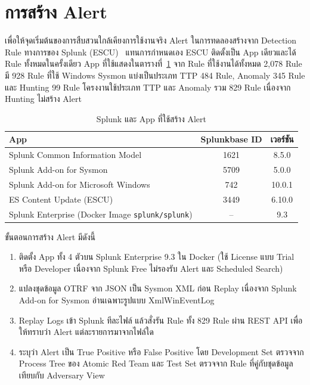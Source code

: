 \section{การสร้าง Alert}
\label{sec:alert}

เพื่อให้จุดเริ่มต้นของการสืบสวนใกล้เคียงการใช้งานจริง Alert ในการทดลองสร้างจาก Detection Rule ทางการของ Splunk (ESCU)~\cite{splunk-escu}
แทนการกำหนดเอง ESCU ติดตั้งเป็น App เดียวและได้ Rule ทั้งหมดในครั้งเดียว
App ที่ใช้แสดงในตารางที่~\ref{tab:splunk-apps}
จาก Rule ที่ใช้งานได้ทั้งหมด 2,078 Rule มี 928 Rule ที่ใช้ Windows Sysmon
แบ่งเป็นประเภท TTP 484 Rule, Anomaly 345 Rule และ Hunting 99 Rule
โครงงานใช้ประเภท TTP และ Anomaly รวม 829 Rule เนื่องจาก Hunting ไม่สร้าง Alert

\begin{table}[ht]
  \centering
  \caption{Splunk และ App ที่ใช้สร้าง Alert}
  \label{tab:splunk-apps}
  \small
  \begin{tabular}{|l|c|c|}
    \hline
    \textbf{App} & \textbf{Splunkbase ID} & \textbf{เวอร์ชัน} \\ \hline
    Splunk Common Information Model & 1621 & 8.5.0 \\ \hline
    Splunk Add-on for Sysmon & 5709 & 5.0.0 \\ \hline
    Splunk Add-on for Microsoft Windows & 742 & 10.0.1 \\ \hline
    ES Content Update (ESCU) & 3449 & 6.10.0 \\ \hline
    Splunk Enterprise (Docker Image \texttt{splunk/splunk}) & -- & 9.3 \\ \hline
  \end{tabular}
\end{table}

ขั้นตอนการสร้าง Alert มีดังนี้
\begin{enumerate}
  \item ติดตั้ง App ทั้ง 4 ตัวบน Splunk Enterprise 9.3 ใน Docker (ใช้ License แบบ Trial หรือ Developer
        เนื่องจาก Splunk Free ไม่รองรับ Alert และ Scheduled Search)
  \item แปลงชุดข้อมูล OTRF จาก JSON เป็น Sysmon XML ก่อน Replay
        เนื่องจาก Splunk Add-on for Sysmon อ่านเฉพาะรูปแบบ XmlWinEventLog
  \item Replay Logs เข้า Splunk ทีละไฟล์ แล้วสั่งรัน Rule ทั้ง 829 Rule ผ่าน REST API
        เพื่อให้ทราบว่า Alert แต่ละรายการมาจากไฟล์ใด
  \item ระบุว่า Alert เป็น True Positive หรือ False Positive
        โดย Development Set ตรวจจาก Process Tree ของ Atomic Red Team
        และ Test Set ตรวจจาก Rule ที่คู่กับชุดข้อมูลเทียบกับ Adversary View
\end{enumerate}

